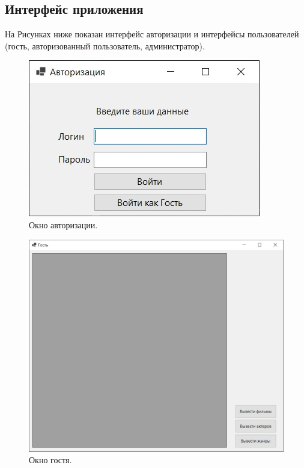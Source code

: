 \subsection{Интерфейс приложения}
На Рисунках ниже показан интерфейс авторизации и интерфейсы пользователей 
(гость, авторизованный пользователь, администратор).

\begin{figure}[h!]
	\centering
	\includegraphics[scale=1]{img/auth.jpg}
	\caption{Окно авторизации.}
	\label{img:auth}
\end{figure}
\begin{figure}[h!]
	\centering
	\includegraphics[scale=0.9]{img/guest.jpg}
	\caption{Окно гостя.}
	\label{img:guest}
\end{figure}
\clearpage
